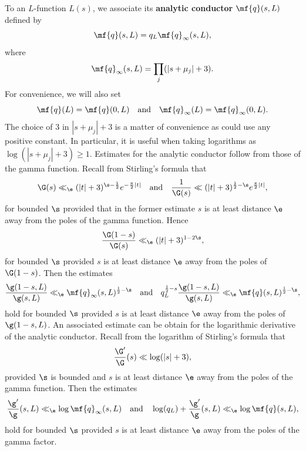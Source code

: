 \documentclass[12pt]{article}
\begin{document}
      To an \(L\)-function \(L(s)\), we associate its \textbf{analytic conductor} \(\mf{q}(s,L)\) defined by
      \[
        \mf{q}(s,L) = q_{L}\mf{q}_{\infty}(s,L),
      \]
      where
      \[
        \mf{q}_{\infty}(s,L) = \prod_{j}(|s+\mu_{j}|+3).
      \]
      For convenience, we will also set
      \[
        \mf{q}(L) = \mf{q}(0,L) \quad \text{and} \quad \mf{q}_{\infty}(L) = \mf{q}_{\infty}(0,L).
      \]
      The choice of \(3\) in \(|s+\mu_{j}|+3\) is a matter of convenience as could use any positive constant. In particular, it is useful when taking logarithms as \(\log(|s+\mu_{j}|+3) \ge 1\). Estimates for the analytic conductor follow from those of the gamma function. Recall from Stirling's formula that
      \begin{equation}\label{equ:vertical_strip_gamma_estimates}
        \G(s) \ll_{\e} (|t|+3)^{\s-\frac{1}{2}}e^{-\frac{\pi}{2}|t|} \quad \text{and} \quad \frac{1}{\G(s)} \ll (|t|+3)^{\frac{1}{2}-\s}e^{\frac{\pi}{2}|t|},
      \end{equation}
      for bounded \(\s\) provided that in the former estimate \(s\) is at least distance \(\e\) away from the poles of the gamma function. Hence
      \[
        \frac{\G(1-s)}{\G(s)} \ll_{\e} (|t|+3)^{1-2\s},
      \]
      for bounded \(\s\) provided \(s\) is at least distance \(\e\) away from the poles of \(\G(1-s)\). Then the estimates
      \begin{equation}\label{equ:gamma_factor_analytic_conductor_estimate}
        \frac{\g(1-s,L)}{\g(s,L)} \ll_{\e} \mf{q}_{\infty}(s,L)^{\frac{1}{2}-\s} \quad \text{and} \quad q_{L}^{\frac{1}{2}-s}\frac{\g(1-s,L)}{\g(s,L)} \ll_{\e} \mf{q}(s,L)^{\frac{1}{2}-\s},
      \end{equation}
      hold for bounded \(\s\) provided \(s\) is at least distance \(\e\) away from the poles of \(\g(1-s,L)\). An associated estimate can be obtain for the logarithmic derivative of the analytic conductor. Recall from the logarithm of Stirling's formula that
      \[
        \frac{\G'}{\G}(s) \ll \log(|s|+3),
      \]
      provided \(\s\) is bounded and \(s\) is at least distance \(\e\) away from the poles of the gamma function. Then the estimates
      \begin{equation}\label{equ:digamma_gamma_factor_analytic_conductor_estimate}
        \frac{\g'}{\g}(s,L) \ll_{\e} \log\mf{q}_{\infty}(s,L) \quad \text{and} \quad \log(q_{L})+\frac{\g'}{\g}(s,L) \ll_{\e} \log\mf{q}(s,L),
      \end{equation}
      hold for bounded \(\s\) provided \(s\) is at least distance \(\e\) away from the poles of the gamma factor.
      
\end{document}

